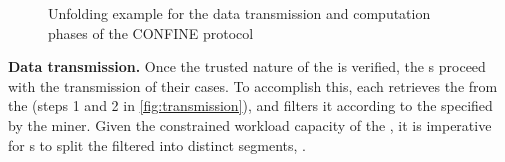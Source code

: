 \begin{figure}[t]
	\hfill
	\hfill	
	\caption{Unfolding example for the data transmission and computation phases of the CONFINE protocol}
	\label{fig:workflow}
\end{figure}
\noindent\textbf{Data transmission.} Once the trusted nature of the  is verified, the s proceed with the transmission of their cases. To accomplish this, each  retrieves the  from the  (steps 1 and 2 in \cref{fig:transmission}), and filters it according to the \NewJ{\CIdS} specified by the miner. Given the constrained workload capacity of the , it is imperative for s to split the filtered  into distinct segments, .  %
